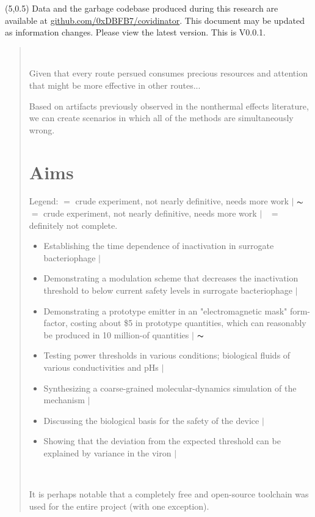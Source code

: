 \documentclass[paper.tex]{subfiles}
\begin{document}
\begin{textblock}{10}(5,0.5)
\noindent Data and the garbage codebase produced during this research are available at \href{https://www.github.com/0xDBFB7/covidinator}{github.com/0xDBFB7/covidinator}. This document may be updated as information changes. Please view the latest version. This is V0.0.1.
\end{textblock}

\begin{quotation}\



Given that every route persued consumes precious resources and attention that might be more effective in 
other routes...



Based on artifacts previously observed in the nonthermal effects literature, we can create scenarios in which all of the methods are simultaneously wrong. 

\section{Aims}




Legend:  \cmark $ = $ crude experiment, not nearly definitive, needs more work $\vert$ $\thicksim$ $ = $ crude experiment, not nearly definitive, needs more work $\vert$ \xmark \ $ = $ definitely not complete.\\

\begin{itemize}
  \item Establishing the time dependence of inactivation in surrogate bacteriophage $\vert$ \cmark
  \item Demonstrating a modulation scheme that decreases the inactivation threshold to below current safety levels in surrogate bacteriophage $\vert$ \cmark
  \item Demonstrating a prototype emitter in an "electromagnetic mask" form-factor, costing about \$5 in prototype quantities, which can reasonably be produced in 10 million-of quantities $\vert$ $\thicksim$
  \item Testing power thresholds in various conditions; biological fluids of various conductivities and pHs $\vert$ \xmark
  \item Synthesizing a coarse-grained molecular-dynamics simulation of the mechanism $\vert$ \xmark
  \item Discussing the biological basis for the safety of the device $\vert$ \cmark
  \item Showing that the deviation from the expected threshold can be explained by variance in the viron $\vert$ \cmark
  
\end{itemize}\


\tableofcontents


It is perhaps notable that a completely free and open-source toolchain was used for the entire project (with one exception).

\end{quotation}
\end{document}
